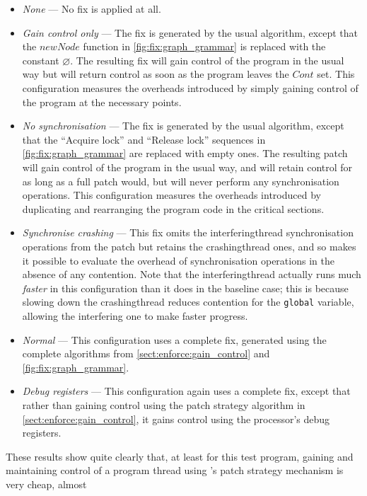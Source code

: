 \begin{itemize}
\item \textit{None} --- No fix is applied at all.
\item \textit{Gain control only} --- The fix is generated by the usual
  algorithm, except that the $\mathit{newNode}$ function in
  \autoref{fig:fix:graph_grammar} is replaced with the constant
  $\varnothing$.  The resulting fix will gain control of the program
  in the usual way but will return control as soon as the program
  leaves the $\mathit{Cont}$ set.  This configuration measures the
  overheads introduced by simply gaining control of the program at the
  necessary points.
\item \textit{No synchronisation} --- The fix is generated by the
  usual algorithm, except that the ``Acquire lock'' and ``Release
  lock'' sequences in \autoref{fig:fix:graph_grammar} are replaced
  with empty ones.  The resulting patch will gain control of the
  program in the usual way, and will retain control for as long as a
  full patch would, but will never perform any synchronisation
  operations.  This configuration measures the overheads introduced by
  duplicating and rearranging the program code in the critical
  sections.
\item \textit{Synchronise crashing} --- This fix omits the
  \gls{interferingthread} synchronisation operations from the patch
  but retains the \gls{crashingthread} ones, and so makes it possible
  to evaluate the overhead of synchronisation operations in the
  absence of any contention.  Note that the \gls{interferingthread}
  actually runs much \emph{faster} in this configuration than it does
  in the baseline case; this is because slowing down the
  \gls{crashingthread} reduces contention for the \texttt{global}
  variable, allowing the interfering one to make faster progress.
\item \textit{Normal} --- This configuration uses a complete fix,
  generated using the complete algorithms from
  \autoref{sect:enforce:gain_control} and
  \autoref{fig:fix:graph_grammar}.
\item \textit{Debug registers} --- This configuration again uses a
  complete fix, except that rather than gaining control using the
  patch strategy algorithm in \autoref{sect:enforce:gain_control}, it
  gains control using the processor's debug registers.
\end{itemize}
These results show quite clearly that, at least for this test program,
gaining and maintaining control of a program thread using
{\technique}'s patch strategy mechanism is very cheap, almost
